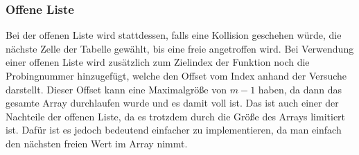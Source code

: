 \documentclass{article}
\begin{document}
	\subsubsection{Offene Liste}
	Bei der offenen Liste wird stattdessen, falls eine Kollision geschehen würde, die nächste Zelle der Tabelle gewählt, bis eine freie angetroffen wird. Bei Verwendung einer offenen Liste wird zusätzlich zum Zielindex der Funktion noch die Probingnummer hinzugefügt, welche den Offset vom Index anhand der Versuche darstellt. Dieser Offset kann eine Maximalgröße von $m-1$ haben, da dann das gesamte Array durchlaufen wurde und es damit voll ist. Das ist auch einer der Nachteile der offenen Liste, da es trotzdem durch die Größe des Arrays limitiert ist. Dafür ist es jedoch bedeutend einfacher zu implementieren, da man einfach den nächsten freien Wert im Array nimmt.



	
	
	
	























	
\end{document}
